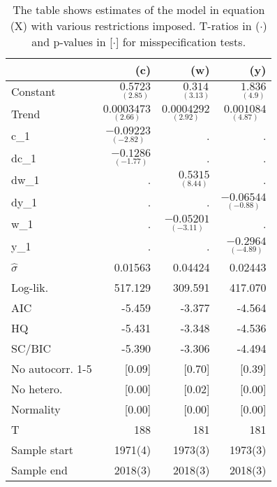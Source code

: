 
\begin{table}[tbph]
\begin{center}
\begin{tabular}{lrrr}
\hline
& (c) & (w) & (y) \\
\hline
Constant & $\underset{(2.85)}{0.5723}$ & $\underset{(3.13)}{0.314}$ & $\underset{(4.9)}{1.836}$ \\
Trend & $\underset{(2.66)}{0.0003473}$ & $\underset{(2.92)}{0.0004292}$ & $\underset{(4.87)}{0.001084}$ \\
c\_1 & $\underset{(-2.82)}{-0.09223}$ & . & . \\
dc\_1 & $\underset{(-1.77)}{-0.1286}$ & . & . \\
dw\_1 & . & $\underset{(8.44)}{0.5315}$ & . \\
dy\_1 & . & . & $\underset{(-0.88)}{-0.06544}$ \\
w\_1 & . & $\underset{(-3.11)}{-0.05201}$ & . \\
y\_1 & . & . & $\underset{(-4.89)}{-0.2964}$ \\
\hline
$\hat{\sigma}$ & 0.01563 & 0.04424 & 0.02443 \\
Log-lik. & 517.129 & 309.591 & 417.070 \\
\hline
AIC & -5.459 & -3.377 & -4.564 \\
HQ & -5.431 & -3.348 & -4.536 \\
SC/BIC & -5.390 & -3.306 & -4.494 \\
\hline
No autocorr. 1-5 & [0.09] & [0.70] & [0.39] \\
No hetero. & [0.00] & [0.02] & [0.00] \\
Normality & [0.00] & [0.00] & [0.00] \\
\hline
T & 188 & 181 & 181 \\
Sample start & 1971(4) & 1973(3) & 1973(3) \\
Sample end & 2018(3) & 2018(3) & 2018(3) \\
\hline
\end{tabular}
\end{center}
\vspace{1em}
\caption{The table shows estimates of the model in equation (X) with various restrictions imposed. T-ratios in ($\cdot$) and p-values in [$\cdot$] for misspecification tests.}
\end{table}
